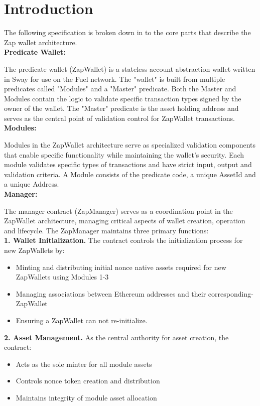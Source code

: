 \section{Introduction}
\label{sec:introduction}

The following specification is broken down in to the core parts that describe the Zap wallet architecture. \\

\textbf{Predicate Wallet:}\

The predicate wallet (ZapWallet) is a stateless account abstraction wallet written in Sway for use on the Fuel network. The "wallet" is built from multiple
predicates called "Modules" and a "Master" predicate. Both the Master and Modules contain the logic to validate specific transaction
types signed by the owner of the wallet. The "Master" predicate is the asset holding address and serves
as the central point of validation control for ZapWallet transactions.\\

\textbf{Modules:}\

Modules in the ZapWallet architecture serve as specialized validation components that enable specific functionality while
maintaining the wallet's security. Each module validates specific types of transactions and have strict input, output and validation
criteria. A Module consists of the predicate code, a unique AssetId and a unique Address. \\

\textbf{Manager:}\

The manager contract (ZapManager) serves as a coordination point in the ZapWallet architecture, managing critical aspects of wallet
creation, operation and lifecycle. The ZapManager maintains three primary functions: \\

\textbf{1. Wallet Initialization.} The contract controls the initialization process for new ZapWallets by:
\begin{itemize}
    \item Minting and distributing initial nonce native assets required for new ZapWallets using Modules 1-3
    \item Managing associations between Ethereum addresses and their corresponding-ZapWallet
    \item Ensuring a ZapWallet can not re-initialize.
\end{itemize}

\textbf{2. Asset Management.} As the central authority for asset creation, the contract:
\begin{itemize}
    \item Acts as the sole minter for all module assets
    \item Controls nonce token creation and distribution
    \item Maintains integrity of module asset allocation
\end{itemize}

